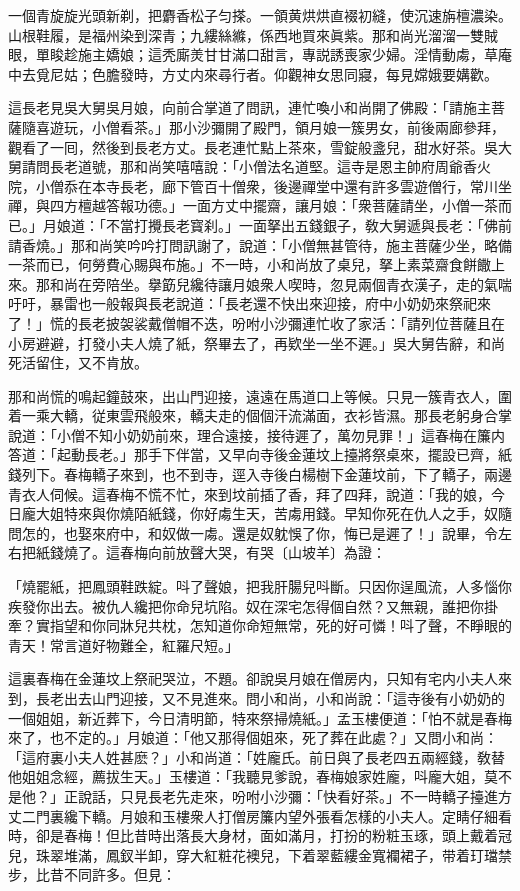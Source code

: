 \begin{myquote}
一個青旋旋光頭新剃，把麝香松子匀搽。一領黄烘烘直裰初縫，使沉速旃檀濃染。山根鞋履，是福州染到深青；九縷絲縧，係西地買來眞紫。那和尚光溜溜一雙賊眼，單睃趁施主嬌娘；這秃廝羙甘甘滿口甜言，專説誘喪家少婦。淫情動䖏，草庵中去覓尼姑；色膽發時，方丈内來尋行者。仰觀神女思同寢，每見嫦娥要媾歡。
\end{myquote}

這長老見吳大舅吳月娘，向前合掌道了問訊，連忙喚小和尚開了佛殿：「請施主菩薩隨喜遊玩，小僧看茶。」那小沙彌開了殿門，領月娘一簇男女，前後兩廊參拜，觀看了一囘，然後到長老方丈。長老連忙點上茶來，雪錠般盞兒，甜水好茶。吳大舅請問長老道號，那和尚笑嘻嘻說：「小僧法名道堅。這寺是恩主帥府周爺香火院，小僧忝在本寺長老，廊下管百十僧衆，後邊禪堂中還有許多雲遊僧行，常川坐禪，與四方檀越答報功德。」一面方丈中擺齋，讓月娘：「衆菩薩請坐，小僧一茶而已。」月娘道：「不當打攪長老寳刹。」一面拏出五錢銀子，敎大舅遞與長老：「佛前請香燒。」那和尚笑吟吟打問訊謝了，說道：「小僧無甚管待，施主菩薩少坐，略備一茶而已，何勞費心賜與布施。」不一時，小和尚放了桌兒，拏上素菜齋食餅饊上來。那和尚在旁陪坐。擧筯兒纔待讓月娘衆人喫時，忽見兩個青衣漢子，走的氣喘吁吁，暴雷也一般報與長老說道：「長老還不快出來迎接，府中小奶奶來祭祀來了！」慌的長老披袈裟戴僧帽不迭，吩咐小沙彌連忙收了家活：「請列位菩薩且在小房避避，打發小夫人燒了紙，祭畢去了，再欵坐一坐不遲。」吳大舅告辭，和尚死活留住，又不肯放。

那和尚慌的鳴起鐘鼓來，出山門迎接，遠遠在馬道口上等候。只見一簇青衣人，圍着一乘大轎，従東雲飛般來，轎夫走的個個汗流滿面，衣衫皆濕。那長老躬身合掌說道：「小僧不知小奶奶前來，理合遠接，接待遲了，萬勿見罪！」這春梅在簾内答道：「起動長老。」那手下伴當，又早向寺後金蓮坟上擡將祭桌來，擺設已齊，紙錢列下。春梅轎子來到，也不到寺，逕入寺後白楊樹下金蓮坟前，下了轎子，兩邊青衣人伺候。這春梅不慌不忙，來到坟前插了香，拜了四拜，說道：「我的娘，今日龐大姐特來與你燒陌紙錢，你好䖏生天，苦䖏用錢。早知你死在仇人之手，奴隨問怎的，也娶來府中，和奴做一䖏。還是奴躭悞了你，悔已是遲了！」說畢，令左右把紙錢燒了。這春梅向前放聲大哭，有哭〔山坡羊〕為證：

\begin{myquote}
「燒罷紙，把鳳頭鞋跌綻。呌了聲娘，把我肝腸兒呌斷。只因你逞風流，人多惱你疾發你出去。被仇人纔把你命兒坑陷。奴在深宅怎得個自然？又無親，誰把你掛牽？實指望和你同牀兒共枕，怎知道你命短無常，死的好可憐！呌了聲，不睜眼的青天！常言道好物難全，紅羅尺短。」
\end{myquote}

這裏春梅在金蓮坟上祭祀哭泣，不題。卻說吳月娘在僧房内，只知有宅内小夫人來到，長老出去山門迎接，又不見進來。問小和尚，小和尚說：「這寺後有小奶奶的一個姐姐，新近葬下，今日清明節，特來祭掃燒紙。」孟玉樓便道：「怕不就是春梅來了，也不定的。」月娘道：「他又那得個姐來，死了葬在此處？」又問小和尚：「這府裏小夫人姓甚麽？」小和尚道：「姓龐氏。前日與了長老四五兩經錢，敎替他姐姐念經，薦拔生天。」玉樓道：「我聽見爹說，春梅娘家姓龐，呌龐大姐，莫不是他？」正說話，只見長老先走來，吩咐小沙彌：「快看好茶。」不一時轎子擡進方丈二門裏纔下轎。月娘和玉樓衆人打僧房簾内望外張看怎樣的小夫人。定睛仔細看時，卻是春梅！但比昔時出落長大身材，面如滿月，打扮的粉粧玉琢，頭上戴着冠兒，珠翠堆滿，鳳釵半卸，穿大紅粧花襖兒，下着翠藍縷金寬襴裙子，带着玎璫禁步，比昔不同許多。但見：

